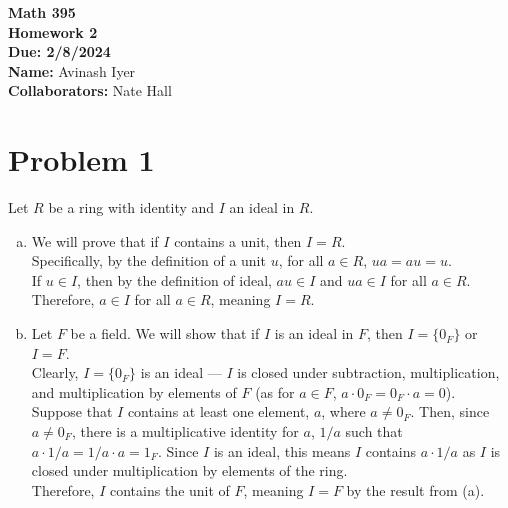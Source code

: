 \documentclass[10pt]{extarticle}
\title{}
\author{}
\date{}
\begin{document}
  \begin{center}
    {\bf \Large Math 395 \\[0.1in]Homework 2 \\[0.1in]
    Due: 2/8/2024}\\[.25in]
    {\bf Name:} {Avinash Iyer}\\[0.15in]
    {\bf Collaborators:} {Nate Hall} \\
  \end{center}
  \section{Problem 1}%
  Let $R$ be a ring with identity and $I$ an ideal in $R$.
  \begin{enumerate}[(a)]
    \item We will prove that if $I$ contains a unit, then $I = R$.\\

      Specifically, by the definition of a unit $u$, for all $a\in R$, $ua = au = u$.\\

      If $u\in I$, then by the definition of ideal, $au\in I$ and $ua \in I$ for all $a\in R$. Therefore, $a\in I$ for all $a\in R$, meaning $I = R$.
    \item Let $F$ be a field. We will show that if $I$ is an ideal in $F$, then $I = \{0_F\}$ or $I = F$.\\

      Clearly, $I = \{0_F\}$ is an ideal --- $I$ is closed under subtraction, multiplication, and multiplication by elements of $F$ (as for $a\in F$, $a\cdot 0_F = 0_F \cdot a = 0$).\\

      Suppose that $I$ contains at least one element, $a$, where $a\neq 0_F$. Then, since $a \neq 0_F$, there is a multiplicative identity for $a$, $1/a$ such that $a\cdot 1/a = 1/a \cdot a = 1_F$. Since $I$ is an ideal, this means $I$ contains $a \cdot 1/a$ as $I$ is closed under multiplication by elements of the ring.\\

      Therefore, $I$ contains the unit of $F$, meaning $I = F$ by the result from (a).
  \end{enumerate}
\end{document}
